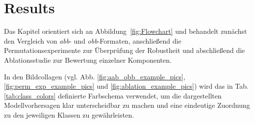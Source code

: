 \chapter{Results}
\label{ch:results}
Das Kapitel orientiert sich an Abbildung~\ref{fig:Flowchart} und behandelt zunächst den Vergleich von \textit{abb}- und \textit{obb}-Formaten, anschließend die Permutationsexperimente zur Überprüfung der Robustheit und abschließend die Ablationsstudie zur Bewertung einzelner Komponenten. 

In den Bildcollagen (vgl. Abb. \ref{fig:aab_obb_example_pics}, \ref{fig:perm_exp_example_pics} und \ref{fig:ablation_example_pics}) wird das in Tab. \ref{tab:class_colors} definierte Farbschema verwendet, um die dargestellten Modellvorhersagen klar unterscheidbar zu machen und eine eindeutige Zuordnung zu den jeweiligen Klassen zu gewährleisten.




